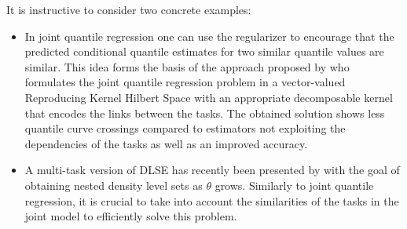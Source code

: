 It is instructive to consider two concrete examples:
\begin{itemize}[labelindent=0em,leftmargin=*,topsep=0cm,partopsep=0cm,
                parsep=2mm,itemsep=0cm]
    \item In joint quantile regression one can use the regularizer to
    encourage that the predicted conditional quantile estimates for two
    similar quantile values are similar. This idea forms the basis of the
    approach proposed by \citet{sangnier2016joint} who formulates the joint
    quantile regression problem in a vector-valued Reproducing Kernel Hilbert
    Space with an appropriate decomposable kernel that encodes the links
    between the tasks. The obtained solution shows less quantile curve
    crossings compared to estimators not exploiting the dependencies of the
    tasks as well as an improved accuracy.
    \item A multi-task version of \ac{DLSE} has recently been presented by
    \citet{glazer2013q} with the goal of obtaining nested density level sets
    as $\theta$ grows. Similarly to joint quantile regression, it is crucial to
    take into account the similarities of the tasks in the joint model to
    efficiently solve this problem.
\end{itemize}







